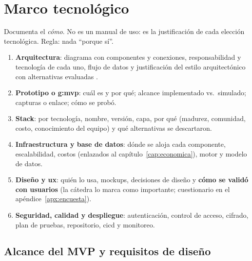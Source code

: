 
\chapter{Marco tecnológico}\label{cap:marco-tecnologico}

\begin{guia}
Documenta el \emph{cómo}. No es un manual de uso: es la justificación
de cada elección tecnológica. Regla: nada ``porque sí''.
\begin{enumerate}
    \item \textbf{Arquitectura}: diagrama con componentes y conexiones,
          responsabilidad y tecnología de cada uno, flujo de datos y
          justificación del estilo arquitectónico con alternativas
          evaluadas \citep{sommerville2016}.
    \item \textbf{Prototipo o \gls{g:mvp}}: cuál es y por qué; alcance
          implementado vs.\ simulado; capturas o enlace; cómo se probó.
    \item \textbf{Stack}: por tecnología, nombre, versión, capa, por qué
          (madurez, comunidad, costo, conocimiento del equipo) y qué
          alternativas se descartaron.
    \item \textbf{Infraestructura y base de datos}: dónde se aloja cada
          componente, escalabilidad, costos (enlazados al
          capítulo~\ref{cap:economica}), motor y modelo de datos.
    \item \textbf{Diseño y \gls{ux}}: quién lo usa, mockups, decisiones de
          diseño y \textbf{cómo se validó con usuarios} (la cátedra lo marca
          como importante; cuestionario en el apéndice~\ref{apx:encuesta}).
    \item \textbf{Seguridad, calidad y despliegue}: autenticación, control
          de acceso, cifrado, plan de pruebas, repositorio, \gls{cicd} y
          monitoreo.
\end{enumerate}
\end{guia}

\section{Alcance del MVP y requisitos de diseño}

